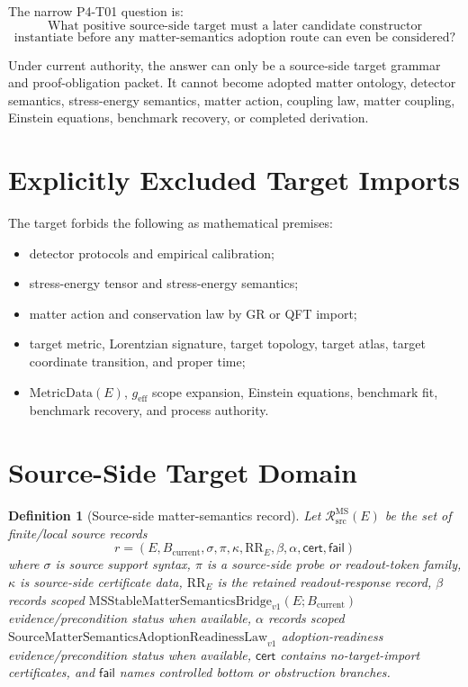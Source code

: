 \documentclass[11pt]{article}
\newcommand{\Bcur}{B_{\mathrm{current}}}
\newcommand{\MSBridge}{\mathrm{MSStableMatterSemanticsBridge}_{v1}}
\newcommand{\SMSAR}{\mathrm{SourceMatterSemanticsAdoptionReadinessLaw}_{v1}}
\newcommand{\RecSrc}{\mathcal R^{\mathrm{MS}}_{\mathrm{src}}}
\newcommand{\RRE}{\mathrm{RR}_E}
\newcommand{\MetricData}{\mathrm{MetricData}}
\newcommand{\geff}{g_{\mathrm{eff}}}
\newtheorem{definition}{Definition}
\begin{document}
The narrow P4-T01 question is:
\[
\text{What positive source-side target must a later candidate constructor}
\]
\[
\text{instantiate before any matter-semantics adoption route can even be
considered?}
\]

Under current authority, the answer can only be a source-side target grammar
and proof-obligation packet. It cannot become adopted matter ontology,
detector semantics, stress-energy semantics, matter action, coupling law,
matter coupling, Einstein equations, benchmark recovery, or completed
derivation.

\section{Explicitly Excluded Target Imports}

The target forbids the following as mathematical premises:
\begin{itemize}[leftmargin=*]
  \item detector protocols and empirical calibration;
  \item stress-energy tensor and stress-energy semantics;
  \item matter action and conservation law by GR or QFT import;
  \item target metric, Lorentzian signature, target topology, target atlas,
  target coordinate transition, and proper time;
  \item \(\MetricData(E)\), \(\geff\) scope expansion, Einstein equations,
  benchmark fit, benchmark recovery, and process authority.
\end{itemize}

\section{Source-Side Target Domain}

\begin{definition}[Source-side matter-semantics record]
Let \(\RecSrc(E)\) be the set of finite/local source records
\[
  r=(E,\Bcur,\sigma,\pi,\kappa,\RRE,\beta,\alpha,\mathsf{cert},
      \mathsf{fail})
\]
where \(\sigma\) is source support syntax, \(\pi\) is a source-side probe or
readout-token family, \(\kappa\) is source-side certificate data, \(\RRE\) is
the retained readout-response record, \(\beta\) records scoped
\(\MSBridge(E;\Bcur)\) evidence/precondition status when available, \(\alpha\)
records scoped \(\SMSAR\) adoption-readiness evidence/precondition status
when available, \(\mathsf{cert}\) contains no-target-import certificates, and
\(\mathsf{fail}\) names controlled bottom or obstruction branches.
\end{definition}
\end{document}
